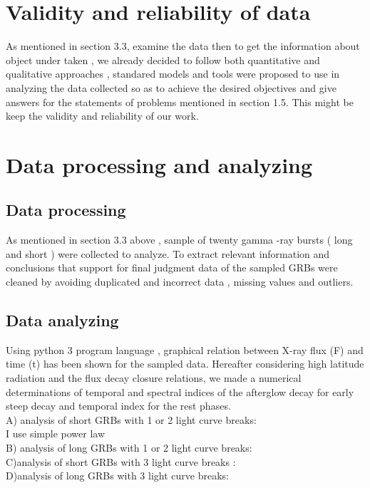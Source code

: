 \section{Validity and reliability of data }
 As mentioned in section 3.3, examine the data then to get the information about object under taken , we already decided to follow both quantitative and qualitative approaches , standared models and tools were  proposed  to use in analyzing the data collected so as to achieve the desired  objectives and give answers  for the  statements of problems mentioned in section 1.5. This might be  keep the validity and reliability of our work.
\section{Data processing and analyzing} 
\subsection{Data processing }
As mentioned in section 3.3 above , sample of  twenty  gamma -ray bursts ( long and short ) were collected to  analyze. To extract relevant information and conclusions  that support for final  judgment  data of the sampled  GRBs  were cleaned by avoiding  duplicated  and incorrect data , missing values and outliers.  
\subsection{Data analyzing}
Using python 3 program language , graphical relation between X-ray  flux (F)  and time (t) has been shown for the sampled  data. Hereafter considering high latitude radiation and the flux decay closure relations, we made a numerical determinations
of temporal and spectral indices of the afterglow decay for early steep decay and temporal index for the rest phases.\\
A) analysis of short GRBs with 1 or 2 light curve breaks:\\
I use simple power law \\
B) analysis of long GRBs with 1 or 2 light curve breaks:\\
C)analysis of short GRBs with 3 light curve breaks :\\
D)analysis of long GRBs with 3 light curve breaks:\\